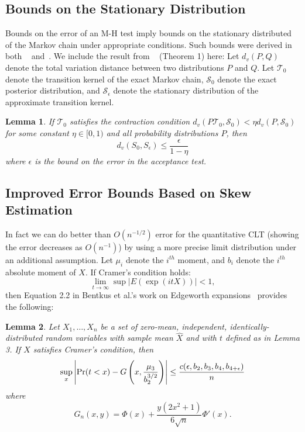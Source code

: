 \documentclass[twoside]{article} \usepackage{aistats2017}
\newtheorem{lemma}{Lemma}
\begin{document}
\subsection{Bounds on the Stationary Distribution}
Bounds on the error of an M-H test imply bounds on the stationary
distributed of the Markov chain under appropriate conditions. Such
bounds were derived in both ~\citet{cutting_mh_2014}
and~\citet{icml2014c1_bardenet14}. We include the result from
~\citet{cutting_mh_2014} (Theorem 1) here: Let $d_v(P,Q)$ denote the total
variation distance between two distributions $P$ and $Q$.  Let
$\mathcal{T}_0$ denote the transition kernel of the exact Markov
chain, $\mathcal{S}_0$ denote the exact posterior distribution,
and  $\mathcal{S}_{\epsilon}$ denote the stationary distribution
of the approximate transition kernel. 
\begin{lemma}
 If $\mathcal{T}_0$ satisfies the contraction
  condition $d_v(P\mathcal{T}_0,\mathcal{S}_0) < \eta
  d_v(P,\mathcal{S}_0)$ for some constant $\eta\in [0,1)$ and all
    probability distributions $P$, then
    \begin{equation}
      d_v(S_0, S_{\epsilon}) \leq\frac{\epsilon}{1-\eta}
    \end{equation}
where $\epsilon$ is the bound on the error in the acceptance test. 
\end{lemma}

\subsection{Improved Error Bounds Based on Skew Estimation}
In fact we can do better than $O(n^{-1/2})$ error for the quantitative CLT (showing the error decreases as
$O(n^{-1})$) by using a more precise limit distribution under an additional
assumption. Let $\mu_i$ denote the $i^{th}$ moment, and $b_i$ denote the
$i^{th}$ absolute moment of $X$. If Cramer's condition holds:
\begin{equation}\label{eq:cramers_condition}
    \lim_{t \to \infty} \sup |E(\exp(i t X))| < 1,
\end{equation}
then Equation 2.2 in Bentkus et al.'s work on Edgeworth
expansions~\citep{Bentkus97} provides the following:

\begin{lemma}\label{lem:clt_edgeworth}
Let $X_1,\ldots,X_n$ be a set of zero-mean, independent, identically-distributed
random variables with sample mean $\hat{X}$ and with $t$ defined as in Lemma 3.
If $X$ satisfies Cramer's condition, then
\begin{equation}\label{eq:clt-bounds_edgeworth}
    \sup_x\left|{\rm Pr}(t<x) - G\left(x, \frac{\mu_3}{b_2^{3/2}}\right)\right| \leq \frac{c(\epsilon,b_2,b_3,b_4,b_{4+\epsilon})}{n}
\end{equation}
where
\begin{equation}
    G_n(x,y) = \Phi(x) + \frac{y(2x^2+1)}{6\sqrt{n}}\Phi'(x).
\end{equation}
\end{lemma}
\end{document}

